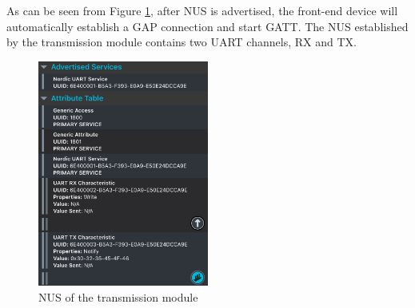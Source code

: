 As can be seen from Figure \ref{fig:nus}, after NUS is advertised, the front-end device will automatically establish a GAP connection and start GATT. The NUS established by the transmission module contains two UART channels, RX and TX.
\begin{figure}[H]
    \centering
    \includegraphics[width=0.5\textwidth]{figure/nus.pdf}
    \caption{NUS of the transmission module}
    \label{fig:nus}
\end{figure}

